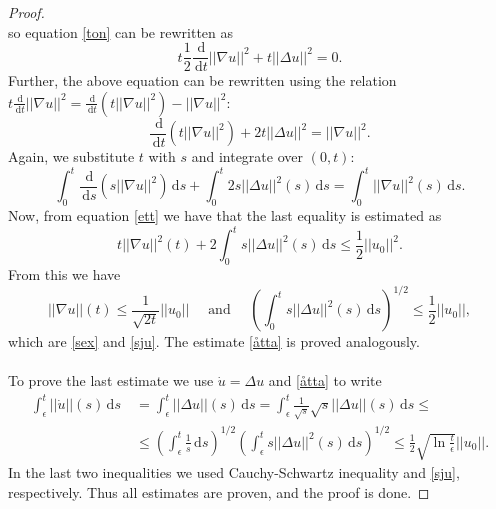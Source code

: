 \documentclass[12pt, a4paper]{article}
\newcommand{\rd}{\ensuremath{\mathrm{d}}}
\newcommand{\id}{\ensuremath{\,\rd}}
\numberwithin{equation}{section}
\begin{document}
\begin{proof}
\begin{equation*}
\end{equation*}
so equation \eqref{ton} can be rewritten as
\begin{equation*}
t\frac{1}{2}\frac{\id}{\id t}||\nabla u||^2 + t ||\Delta u||^2 = 0.
\end{equation*}
Further, the above equation can be rewritten using the relation $t\frac{\id}{\id t}||\nabla u||^2 = \frac{\id}{\id t}(t||\nabla u||^2) - ||\nabla u||^2$:
\begin{equation*}
\frac{\id}{\id t}\left(t ||\nabla u||^2\right) + 2t||\Delta u||^2 = ||\nabla u||^2.
\end{equation*}
Again, we substitute $t$ with $s$ and integrate over $(0,t)$:
\begin{equation*}
\int_0^t \frac{\id}{\id s}\left ( s||\nabla u||^2\right ) \id s + \int_0^t 2s||\Delta u||^2 (s) \id s = \int_0^t ||\nabla u||^2(s) \id s.
\end{equation*}
Now, from equation \eqref{ett} we have that the last equality is estimated as
\begin{equation*}
t||\nabla u||^2(t) + 2\int_0^t s||\Delta u||^2(s) \id s \leq \frac{1}{2}||u_0||^2.
\end{equation*}
From this we have
\begin{equation*}
||\nabla u||(t) \leq \frac{1}{\sqrt{2t}}||u_0|| \quad \text{ and } \quad \left(\int_0^t s||\Delta u||^2(s)\id s \right )^{1/2} \leq \frac{1}{2}||u_0||,
\end{equation*}
which are \eqref{sex} and \eqref{sju}. The estimate \eqref{åtta} is proved analogously.
\\\\
To prove the last estimate we use $\dot{u} = \Delta u$ and \eqref{åtta} to write
\begin{equation*}
\begin{split}
\int_\epsilon^t ||\dot{u}||(s) \id s\ &= \int_\epsilon^t ||\Delta u||(s) \id s = \int_\epsilon^t \frac{1}{\sqrt{s}}\sqrt{s}||\Delta u||(s)\id s \leq \\
&\leq \left ( \int_\epsilon^t \frac{1}{s} \id s\right )^{1/2}\left ( \int_\epsilon^t s ||\Delta u||^2(s) \id s \right )^{1/2} \leq \frac{1}{2}\sqrt{\ln{\frac{t}{\epsilon}}}||u_0||.
\end{split}
\end{equation*}
In the last two inequalities we used Cauchy-Schwartz  inequality and \eqref{sju}, respectively. Thus all estimates are proven, and the proof is done.
\end{proof}
\end{document}

